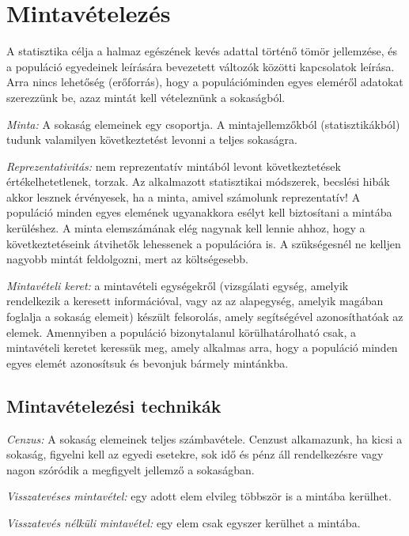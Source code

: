 \chapter{Mintavételezés} \label{ch:mintavetel}

A statisztika célja a halmaz egészének kevés adattal történő tömör 
jellemzése, és a populáció egyedeinek leírására bevezetett változók közötti kapcsolatok leírása. Arra nincs lehetőség (erőforrás), hogy  a populációminden egyes eleméről adatokat szerezzünk be, azaz mintát kell vételeznünk a sokaságból.

\emph{Minta:} A sokaság elemeinek egy csoportja. A mintajellemzőkból (statisztikákból) tudunk valamilyen következtetést levonni a teljes sokaságra.

\emph{Reprezentativitás:} nem reprezentatív mintából levont következtetések értékelhetetlenek, torzak. Az alkalmazott statisztikai módszerek, becslési hibák akkor lesznek érvényesek, ha a minta, amivel számolunk reprezentatív! A populáció minden egyes elemének ugyanakkora esélyt kell biztosítani a mintába kerüléshez. A minta elemszámának elég nagynak kell lennie ahhoz, hogy a következtetéseink átvihetők lehessenek a populációra is. A szükségesnél ne kelljen nagyobb mintát feldolgozni, mert az költségesebb.

\emph{Mintavételi keret:} a mintavételi egységekről (vizsgálati egység, amelyik rendelkezik a keresett információval, vagy az az alapegység, amelyik magában foglalja a sokaság elemeit) készült felsorolás, amely segítségével azonosíthatóak az elemek. Amennyiben a populáció bizonytalanul körülhatárolható csak, a mintavételi keretet keressük meg, amely alkalmas arra, hogy a populáció minden egyes elemét azonosítsuk és bevonjuk bármely mintánkba.

\section{Mintavételezési technikák}

\emph{Cenzus:} A sokaság elemeinek teljes számbavétele. Cenzust alkamazunk, ha kicsi a sokaság, figyelni kell az egyedi esetekre, sok idő és pénz áll rendelkezésre vagy nagon szóródik a megfigyelt jellemző a sokaságban.

\emph{Visszatevéses mintavétel:} egy adott elem elvileg többször is a mintába kerülhet.

\emph{Visszatevés nélküli mintavétel:} egy elem csak egyszer kerülhet a mintába.

